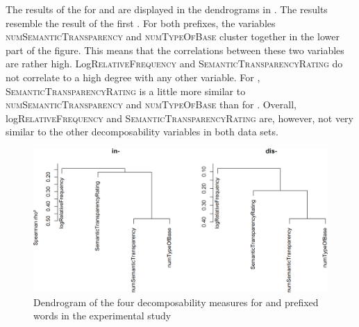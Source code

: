   
 The results of the  for  and  are displayed in the dendrograms in . The results resemble the result of the first .
 For both prefixes, the variables \textsc{numSemanticTransparency} and \textsc{numTypeOfBase} cluster together in the lower part of the figure. This means that the correlations between these two variables are rather high. Log\textsc{RelativeFrequency} and \textsc{SemanticTransparencyRating} do not correlate to a high degree with any other variable.
 For , \textsc{SemanticTransparencyRating} is a little more similar to \textsc{numSemanticTransparency} and \textsc{numTypeOfBase} than for . 
 Overall, log\textsc{RelativeFrequency} and \textsc{SemanticTransparencyRating} are, however, not very similar to the other decomposability variables in both data sets. 

\begin{figure}
  	\includegraphics[scale=0.5]{images/Experiment/clusterAnalysisDecomposabilityExpDisAndIn.png}
  	\caption{Dendrogram of the four decomposability measures for  and prefixed words in the experimental study}
  	\label{fig:cluster experiment dis and in}
  \end{figure} 
 

